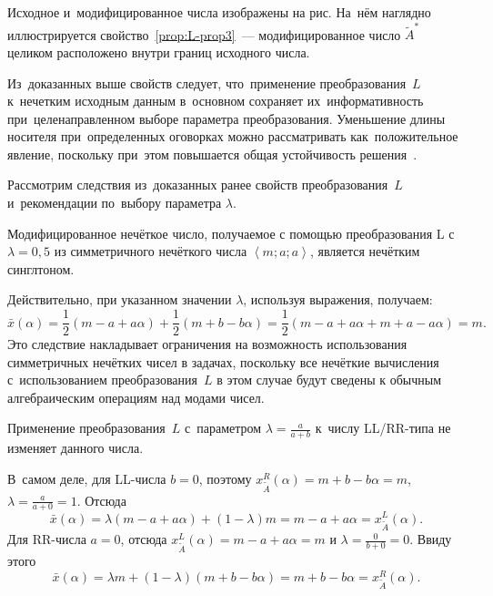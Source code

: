Исходное и~модифицированное числа изображены на рис. На~нём наглядно иллюстрируется свойство~\ref{prop:L-prop3}~--- модифицированное число $\tilde A^{*}$ целиком расположено внутри границ исходного числа.

Из~доказанных выше свойств следует, что~применение преобразования~$L$ к~нечетким исходным данным в~основном сохраняет их~информативность при~целенаправленном выборе параметра преобразования. Уменьшение длины носителя при~определенных оговорках можно рассматривать как~положительное явление, поскольку при~этом повышается общая устойчивость решения~\cite{Vorontsov_PI}.

Рассмотрим следствия из~доказанных ранее свойств преобразования~$L$ и~рекомендации по~выбору параметра $\lambda$.
\begin{cor}
Модифицированное нечёткое число, получаемое с помощью преобразования L с~$\lambda =0,5$ из симметричного нечёткого числа $\left\langle m;a;a \right\rangle$, является нечётким синглтоном.
\end{cor}
Действительно, при указанном значении $\lambda $, используя выражения, получаем:
\begin{equation*}
  \bar{x}\left( \alpha  \right)=\frac{1}{2}\left( m-a+a\alpha  \right)+\frac{1}{2}\left( m+b-b\alpha  \right)=\frac{1}{2}\left( m-a+a\alpha +m+a-a\alpha  \right)=m.
\end{equation*}
Это следствие накладывает ограничения на возможность использования симметричных нечётких чисел в задачах, поскольку все нечёткие вычисления с~использованием преобразования~$L$ в этом случае будут сведены к обычным алгебраическим операциям над модами чисел.

\begin{cor}
Применение преобразования~$L$ с~параметром $\displaystyle \lambda =\frac{a}{a+b}$ к~числу LL/RR-типа не изменяет данного числа.
\end{cor}
В~самом деле, для LL-числа $b=0$, поэтому $x_{{\tilde{A}}}^{R}\left( \alpha  \right)=m+b-b\alpha=m$, $\lambda=\frac{a}{a+0}=1$. Отсюда
\begin{equation*}
  \bar{x}\left( \alpha  \right)=\lambda \left( m-a+a\alpha  \right)+\left( 1-\lambda  \right)m=m-a+a\alpha =x_{\tilde A}^{L}\left( \alpha  \right).
\end{equation*}
Для RR-числа $a=0$, отсюда $x_{\tilde A}^{L}\left( \alpha  \right)=m-a+a\alpha=m$ и $\lambda =\frac{0}{b+0}=0$. Ввиду этого
\begin{equation*}
  \bar{x}\left( \alpha  \right)=\lambda m+\left( 1-\lambda  \right)\left( m+b-b\alpha  \right)=m+b-b\alpha =x_{\tilde A}^{R}\left( \alpha  \right).
\end{equation*}

